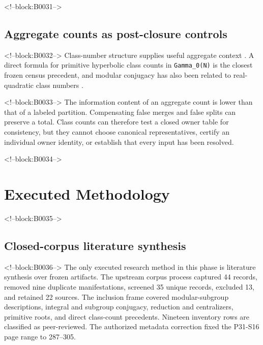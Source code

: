 \documentclass[11pt]{article}
\begin{document}
<!--block:B0031-->
\hypertarget{24-aggregate-counts-as-post-closure-controls}{%
\subsection{Aggregate counts as post-closure
controls}\label{24-aggregate-counts-as-post-closure-controls}}

<!--block:B0032-->
Class-number structure supplies useful aggregate context
\citep{P31-S14}.
A direct formula for primitive hyperbolic class counts in
\texttt{Gamma\_0(N)} is the closest frozen census precedent, and modular
conjugacy has also been related to real-quadratic class numbers
\citep{P31-S21,P31-S22}.

<!--block:B0033-->
The information content of an aggregate count is lower than that of a
labeled partition. Compensating false merges and false splits can
preserve a total. Class counts can therefore test a closed owner table
for consistency, but they cannot choose canonical representatives,
certify an individual owner identity, or establish that every input has
been resolved.

<!--block:B0034-->
\hypertarget{3-executed-methodology}{%
\section{Executed Methodology}\label{3-executed-methodology}}

<!--block:B0035-->
\hypertarget{31-closed-corpus-literature-synthesis}{%
\subsection{Closed-corpus literature
synthesis}\label{31-closed-corpus-literature-synthesis}}

<!--block:B0036-->
The only executed research method in this phase is literature synthesis
over frozen artifacts. The upstream corpus process captured 44 records,
removed nine duplicate manifestations, screened 35 unique records,
excluded 13, and retained 22 sources. The inclusion frame covered
modular-subgroup descriptions, integral and subgroup conjugacy,
reduction and centralizers, primitive roots, and direct class-count
precedents. Nineteen inventory rows are classified as peer-reviewed. The
authorized metadata correction fixed the P31-S16 page range to 287--305.
\end{document}
